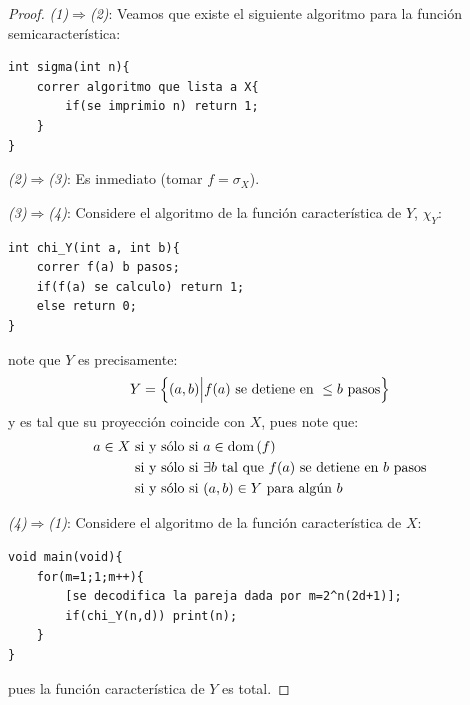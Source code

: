 \documentclass[12pt]{report}
\newcounter{it}
\theoremstyle{largebreak}
\newcommand{\dom}[1]{\textup{dom}\left(#1 \right)}
\begin{document}
    \begin{proof}
        \textit{(1)$\Rightarrow$(2)}: Veamos que existe el siguiente algoritmo para la función semicaracterística:
        
        \begin{lstlisting}
int sigma(int n){
    correr algoritmo que lista a X{
        if(se imprimio n) return 1;
    }
}
        \end{lstlisting}

        \textit{(2)$\Rightarrow$(3)}: Es inmediato (tomar $f=\sigma_X$).

        \textit{(3)$\Rightarrow$(4)}: Considere el algoritmo de la función característica de $Y$, $\chi_Y$:

        \begin{lstlisting}
int chi_Y(int a, int b){
    correr f(a) b pasos;
    if(f(a) se calculo) return 1;
    else return 0;
}
        \end{lstlisting}
        
        note que $Y$ es precisamente:
        \begin{equation*}
            Y=\left\{(a,b)\Big|f(a)\textup{ se detiene en }\leq b\textup{ pasos} \right\}
        \end{equation*}
        y es tal que su proyección coincide con $X$, pues note que:
        \begin{equation*}
            \begin{split}
                a\in X & \textup{ si y sólo si } a\in\dom{f} \\
                &\textup{ si y sólo si }\exists b\textup{ tal que }f(a)\textup{ se detiene en }b\textup{ pasos}\\
                &\textup{ si y sólo si }(a,b)\in Y\textup{ para algún }b \\
            \end{split}
        \end{equation*}

        \textit{(4)$\Rightarrow$(1)}: Considere el algoritmo de la función característica de $X$:

        \begin{lstlisting}
void main(void){
    for(m=1;1;m++){
        [se decodifica la pareja dada por m=2^n(2d+1)];
        if(chi_Y(n,d)) print(n);
    }
}
        \end{lstlisting}
        pues la función característica de $Y$ es total.

    \end{proof}
\end{document}
